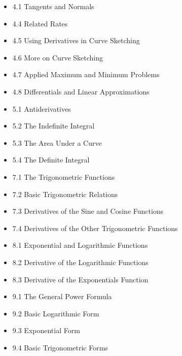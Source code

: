 \documentclass[11pt]{article}
\begin{document}
\begin{itemize}
  \item 4.1 Tangents and Normals
  \item 4.4 Related Rates
  \item 4.5 Using Derivatives in Curve Sketching
  \item 4.6 More on Curve Sketching
  \item 4.7 Applied Maximum and Minimum Problems
  \item 4.8 Differentials and Linear Approximations
  \item 5.1 Antiderivatives
  \item 5.2 The Indefinite Integral
  \item 5.3 The Area Under a Curve
  \item 5.4 The Definite Integral
  \item 7.1 The Trigonometric Functions
  \item 7.2 Basic Trigonometric Relations
  \item 7.3 Derivatives of the Sine and Cosine Functions
  \item 7.4 Derivatives of the Other Trigonometric Functions
  \item 8.1 Exponential and Logarithmic Functions
  \item 8.2 Derivative of the Logarithmic Functions
  \item 8.3 Derivative of the Exponentials Function
  \item 9.1 The General Power Formula
  \item 9.2 Basic Logarithmic Form
  \item 9.3 Exponential Form
  \item 9.4 Basic Trigonometric Forms
\end{itemize}
\end{document}
